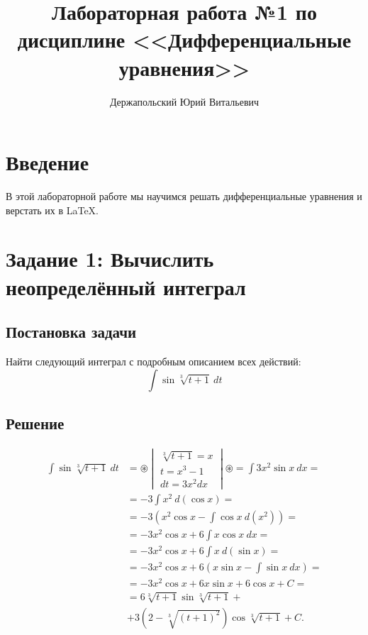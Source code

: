 \documentclass[14pt, a4paper, titlepage, fleqn]{extarticle}
\title{Лабораторная работа №1 по дисциплине <<Дифференциальные уравнения>>}
\author{Держапольский Юрий Витальевич}
\begin{document}
    \maketitle

    \tableofcontents

    \pagebreak

    \section{Введение}
        В этой лабораторной работе мы научимся решать дифференциальные
        уравнения и верстать их в \LaTeX.

    \pagebreak

    \section{Задание 1: Вычислить неопределённый интеграл}
        \subsection{Постановка задачи}
            Найти следующий интеграл с подробным описанием всех действий:
            \[ \int \sin{ \sqrt[3]{t+1} } ~ dt \]
        
        \subsection{Решение}
            \[
                \begin{split}
                    \int \sin{ \sqrt[3]{t+1} } ~ dt &= \circledast
                    \begin{vmatrix}
                        \sqrt[3]{t+1} = x \\
                        t = x^3 - 1 \\
                        dt = 3x^2dx 
                    \end{vmatrix}
                    \circledast = \int 3x^2\sin{x} ~ dx = \\
                    &= -3 \int x^2 ~ d(\cos{x}) = \\
                    &= -3 \left( 
                        x^2\cos{x} - \int \cos{x} ~ d \left(x^2\right) 
                    \right) = \\
                    &= -3x^2\cos{x} + 6 \int x \cos{x} ~ dx = \\
                    &= -3x^2\cos{x} + 6 \int x ~ d(\sin{x}) = \\
                    &= -3x^2\cos{x} + 6\left(x\sin{x} - \int \sin{x} ~ dx \right)=\\
                    &= -3x^2\cos{x} + 6x\sin{x} + 6\cos{x} + C =\\
                    &= 6 \sqrt[3]{t+1} \sin{\sqrt[3]{t+1}} + \\
                    &+ 3\left(2 - \sqrt[3]{(t+1)^2}\right) \cos{\sqrt[3]{t+1}}+C.
                \end{split}    
            \]
\end{document}
